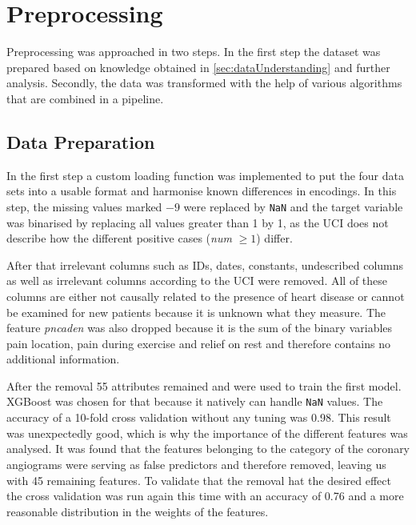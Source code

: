 




\section{Preprocessing} \label{sec:preprocessing}

Preprocessing was approached in two steps. In the first step the dataset was prepared based on knowledge obtained in \cref{sec:dataUnderstanding} and further analysis. 
Secondly, the data was transformed with the help of various algorithms that are combined in a pipeline. 

\subsection{Data Preparation }
In the first step a custom loading function was implemented to put the four data sets into a usable format and harmonise known differences in encodings. In this step, the missing values marked \texttt{$-9$} were replaced by \texttt{NaN} and the target variable was binarised by replacing all values greater than 1 by 1, as the UCI does not describe how the different positive cases (\textit{num} $\geq 1$) differ.

After that irrelevant columns such as IDs, dates, constants, undescribed columns as well as irrelevant columns according to the UCI were removed. All of these columns are either not causally related to the presence of heart disease or cannot be examined for new patients because it is unknown what they measure. The feature \textit{pncaden} was also dropped because it is the sum of the binary variables  pain location, pain during exercise and relief on rest and therefore contains no additional information. 

After the removal 55 attributes remained and were used to train the first model. XGBoost was chosen for that because it natively can handle \texttt{NaN} values. The accuracy of a 10-fold cross validation without any tuning was 0.98. This result was unexpectedly good, which is why   the importance of the different features was analysed. It was found that the features belonging to the category of the coronary angiograms were serving as false predictors and therefore removed, leaving us with 45 remaining features. To validate that the removal hat the desired effect the cross validation was run again this time with an accuracy of 0.76 and a more reasonable distribution in the weights of the features.   

